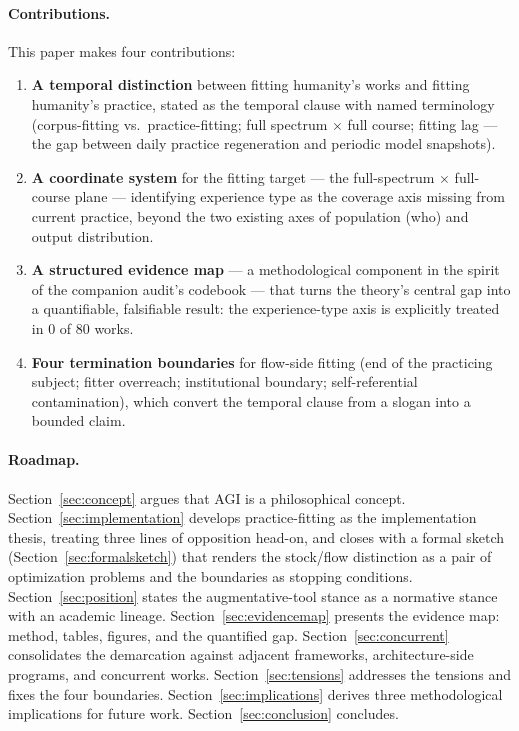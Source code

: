 \documentclass[10pt]{article}
\begin{document}
\paragraph{Contributions.}
This paper makes four contributions:
\begin{enumerate}
\item \textbf{A temporal distinction} between fitting humanity's works and fitting humanity's practice, stated as the temporal clause with named terminology (corpus-fitting vs.\ practice-fitting; full spectrum $\times$ full course; fitting lag --- the gap between daily practice regeneration and periodic model snapshots).
\item \textbf{A coordinate system} for the fitting target --- the full-spectrum $\times$ full-course plane --- identifying experience type as the coverage axis missing from current practice, beyond the two existing axes of population (who) and output distribution.
\item \textbf{A structured evidence map} --- a methodological component in the spirit of the companion audit's codebook \cite{yu2026failure} --- that turns the theory's central gap into a quantifiable, falsifiable result: the experience-type axis is explicitly treated in 0 of 80 works.
\item \textbf{Four termination boundaries} for flow-side fitting (end of the practicing subject; fitter overreach; institutional boundary; self-referential contamination), which convert the temporal clause from a slogan into a bounded claim.
\end{enumerate}

\paragraph{Roadmap.}
Section~\ref{sec:concept} argues that AGI is a philosophical concept. Section~\ref{sec:implementation} develops practice-fitting as the implementation thesis, treating three lines of opposition head-on, and closes with a formal sketch (Section~\ref{sec:formalsketch}) that renders the stock/flow distinction as a pair of optimization problems and the boundaries as stopping conditions. Section~\ref{sec:position} states the augmentative-tool stance as a normative stance with an academic lineage. Section~\ref{sec:evidencemap} presents the evidence map: method, tables, figures, and the quantified gap. Section~\ref{sec:concurrent} consolidates the demarcation against adjacent frameworks, architecture-side programs, and concurrent works. Section~\ref{sec:tensions} addresses the tensions and fixes the four boundaries. Section~\ref{sec:implications} derives three methodological implications for future work. Section~\ref{sec:conclusion} concludes.
\end{document}
